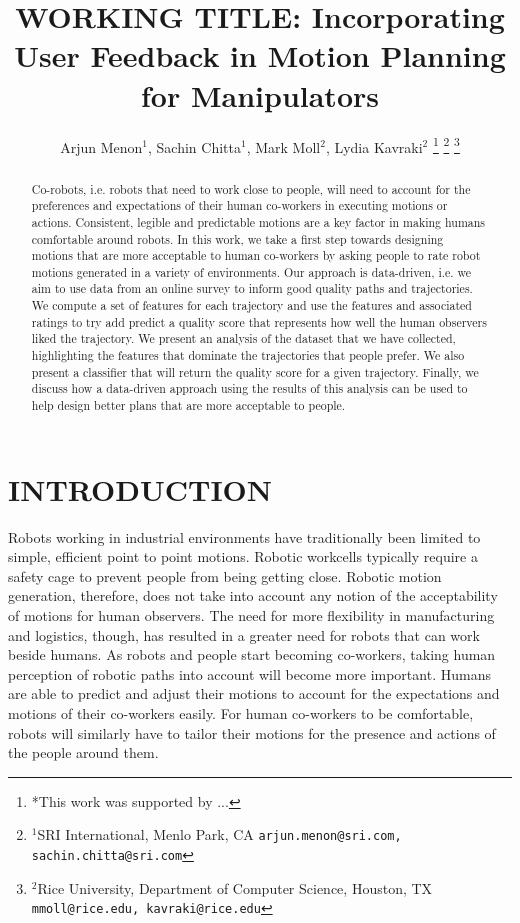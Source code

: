 \documentclass[letterpaper, 10 pt, conference]{ieeeconf}  %
\title{\LARGE \bf
WORKING TITLE: Incorporating User Feedback in Motion Planning for Manipulators
}
\author{Arjun Menon$^{1}$, Sachin Chitta$^{1}$, Mark Moll$^{2}$, Lydia Kavraki$^{2}$%
\thanks{*This work was supported by ...}%
\thanks{$^{1}$SRI International, Menlo Park, CA
        {\tt\small arjun.menon@sri.com, sachin.chitta@sri.com}}%
\thanks{$^{2}$Rice University, Department of Computer Science, Houston, TX
        {\tt\small mmoll@rice.edu, kavraki@rice.edu}}%
}
\begin{document}
\maketitle
\thispagestyle{empty}
\pagestyle{empty}


\begin{abstract}

Co-robots, i.e. robots that need to work close to people, will need to account for the preferences and expectations of their human 
co-workers in executing motions or actions. Consistent, legible and predictable motions are a key factor in making humans comfortable 
around robots. In this work, we take a first step towards designing motions that are more acceptable to human co-workers by asking 
people to rate robot motions generated in a variety of environments. Our approach is data-driven, i.e. we aim to use data from an online 
survey to inform good quality paths and trajectories. We compute a set of features for each trajectory and use the features 
and associated ratings to try add predict a quality score that represents how well the human observers liked the trajectory. We present an 
analysis of the dataset that we have collected, highlighting the features that dominate the trajectories that people prefer. We also 
present a classifier that will return the quality score for a given trajectory. Finally, we discuss how a data-driven approach using the 
results of this analysis can be used to help design better plans that are more acceptable to people. 
\end{abstract}


\section{INTRODUCTION}

Robots working in industrial environments have traditionally been limited to simple, efficient point to point motions. Robotic workcells 
typically require a safety cage to prevent people from being getting close. Robotic motion generation, therefore, does not take 
into account any notion of the acceptability of motions for human observers. The need for more flexibility in manufacturing and logistics, 
though, has resulted in a greater need for robots that can work beside humans. As robots and people start becoming co-workers, taking 
human perception of robotic paths into account will become more important. Humans are able to predict and adjust their motions to 
account for the expectations and motions of their co-workers easily. For human co-workers to be comfortable, robots will similarly 
have to tailor their motions for the presence and actions of the people around them. 
\end{document}
